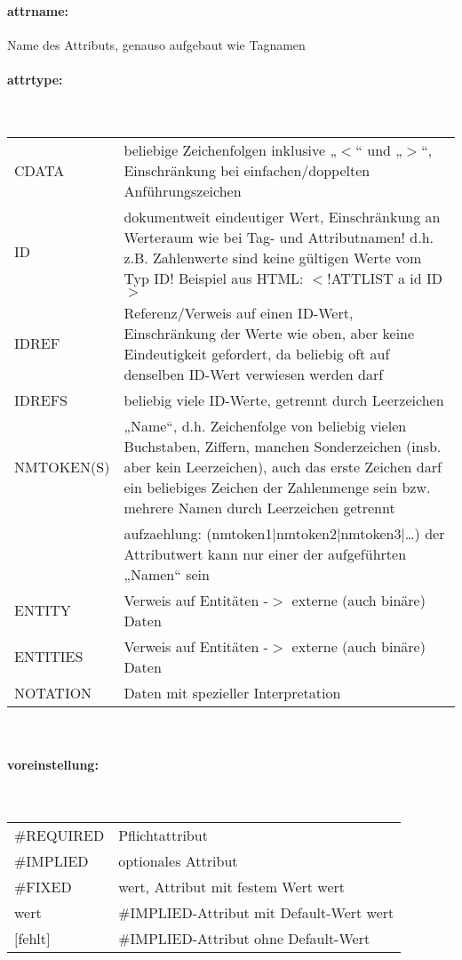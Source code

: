 \paragraph{attrname:}Name des Attributs, genauso aufgebaut wie Tagnamen
\paragraph{attrtype:}\hspace*{0,5mm}\\
\begin{tabular}{ll}
CDATA & beliebige Zeichenfolgen inklusive „$<$“ und „$>$“, Einschränkung bei einfachen/doppelten Anführungszeichen\\
ID & dokumentweit eindeutiger Wert, Einschränkung an Werteraum wie bei Tag- und Attributnamen! d.h. z.B. Zahlenwerte sind keine gültigen Werte vom Typ ID!	Beispiel aus HTML: $<$!ATTLIST a id ID$>$\\
IDREF & Referenz/Verweis auf einen ID-Wert, Einschränkung der Werte wie oben, aber keine 	Eindeutigkeit gefordert, da beliebig oft auf denselben ID-Wert verwiesen werden darf\\
IDREFS & beliebig viele ID-Werte, getrennt durch Leerzeichen\\
NMTOKEN(S) & „Name“, d.h. Zeichenfolge von beliebig vielen Buchstaben, Ziffern, manchen Sonderzeichen (insb. aber kein Leerzeichen), auch das erste Zeichen darf ein beliebiges Zeichen der Zahlenmenge sein bzw. mehrere Namen durch Leerzeichen getrennt\\
 & aufzaehlung: (nmtoken1|nmtoken2|nmtoken3|…) der Attributwert kann nur einer der aufgeführten „Namen“ sein\\
ENTITY & Verweis auf Entitäten -$>$ externe (auch binäre) Daten\\
ENTITIES & Verweis auf Entitäten -$>$ externe (auch binäre) Daten\\
NOTATION & Daten mit spezieller Interpretation\\
\end{tabular}\\
\paragraph{voreinstellung:}\hspace*{0,5mm}\\
\begin{tabular}{ll}
\#REQUIRED & Pflichtattribut\\
\#IMPLIED & optionales Attribut\\
\#FIXED & wert, Attribut mit festem Wert wert\\
wert & \#IMPLIED-Attribut mit Default-Wert wert\\
$[$fehlt$]$ & \#IMPLIED-Attribut ohne Default-Wert\\
\end{tabular}

